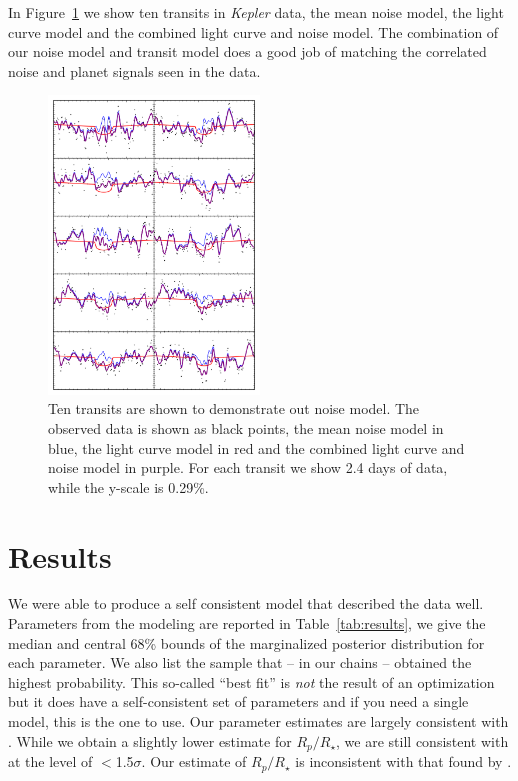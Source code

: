\documentclass[apjl]{emulateapj}
\begin{document}
In Figure~\ref{fig:filter} we show ten transits in \emph{Kepler} data, the mean noise model, the light curve model and the combined light curve and noise model. The combination of our noise model and transit model does a good job of matching the correlated noise and planet signals seen in the data.

\begin{figure}
\includegraphics[width=0.50\textwidth]{ten_transits.png}
\caption{Ten transits are shown to demonstrate out noise model. The observed data is shown as black points, the mean noise model in blue, the light curve model in red and the combined light curve and noise model in purple. For each transit we show 2.4 days of data, while the y-scale is 0.29\%.}
\label{fig:filter}
\end{figure}


\section{Results}
We were able to produce a self consistent model that described the data well. Parameters from the modeling are reported in Table~\ref{tab:results}, we give the median and central 68\% bounds of the marginalized posterior distribution for each parameter. We also list the sample that -- in our chains -- obtained the highest probability. This so-called ``best fit'' is \emph{not} the result of an optimization but it does have a self-consistent set of parameters and if you need a single model, this is the one to use. Our parameter estimates are largely consistent with \citet{lillo14}. While we obtain a slightly lower estimate for $R_{p}/R_{\star}$, we are still consistent with \citet{lillo14} at the level of $<$1.5$\sigma$. Our estimate of $R_{p}/R_{\star}$ is inconsistent with that found by \citet{sliski14}.
\end{document}
